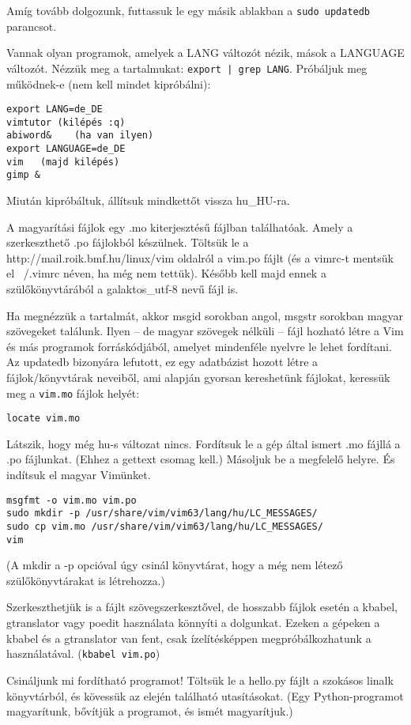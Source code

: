 \documentclass[a4paper]{article}
\newcommand{\alapcim}{http://mail.roik.bmf.hu/linux}
\newcommand{\code}{\texttt}
\begin{document}
Amíg tovább dolgozunk, futtassuk le egy másik ablakban a \code{sudo
updatedb} parancsot.

Vannak olyan programok, amelyek a LANG változót nézik, mások a LANGUAGE
változót. Nézzük meg a tartalmukat: \code{export | grep LANG}.
Próbáljuk meg működnek-e (nem kell mindet kipróbálni):
\begin{Verbatim}
export LANG=de_DE
vimtutor (kilépés :q)
abiword&	(ha van ilyen)
export LANGUAGE=de_DE
vim   (majd kilépés)
gimp &
\end{Verbatim}
Miután kipróbáltuk, állítsuk mindkettőt vissza hu\_HU-ra.

A magyarítási fájlok egy .mo kiterjesztésű fájlban találhatóak. Amely a
szerkeszthető .po fájlokból készülnek. Töltsük le a \alapcim/vim
oldalról a vim.po fájlt (és a vimrc-t mentsük el ~/.vimrc néven, ha még
nem tettük). Később kell majd ennek a szülőkönyvtárából a galaktos\_utf-8
nevű fájl is.

Ha megnézzük a tartalmát, akkor msgid sorokban angol, msgstr sorokban
magyar szövegeket találunk. Ilyen -- de magyar szövegek nélküli -- fájl
hozható létre a Vim  és más programok forráskódjából, amelyet mindenféle
nyelvre le lehet fordítani. Az updatedb bizonyára lefutott, ez egy
adatbázist hozott létre a fájlok/könyvtárak neveiből, ami alapján
gyorsan kereshetünk fájlokat, keressük meg a \code{vim.mo} fájlok
helyét:
\begin{Verbatim}
locate vim.mo
\end{Verbatim}

Látszik, hogy még hu-s változat nincs. Fordítsuk le a gép által ismert
.mo fájllá a .po fájlunkat. (Ehhez a gettext csomag kell.) Másoljuk be
a megfelelő helyre. És indítsuk el magyar Vimünket.
\begin{Verbatim}
msgfmt -o vim.mo vim.po
sudo mkdir -p /usr/share/vim/vim63/lang/hu/LC_MESSAGES/
sudo cp vim.mo /usr/share/vim/vim63/lang/hu/LC_MESSAGES/
vim
\end{Verbatim}
(A mkdir a -p opcióval úgy csinál könyvtárat, hogy a még nem létező
szülőkönyvtárakat is létrehozza.)

Szerkeszthetjük is a fájlt szövegszerkesztővel, de hosszabb fájlok
esetén a kbabel, gtranslator vagy poedit használata könnyíti a
dolgunkat. Ezeken a gépeken a kbabel és a gtranslator van fent, csak ízelítésképpen
megpróbálkozhatunk a használatával. (\code{kbabel vim.po})

Csináljunk mi fordítható programot! Töltsük le a hello.py
fájlt a szokásos linalk könyvtárból, és kövessük az elején található
utasításokat.  (Egy Python-programot  magyarítunk, bővítjük a programot,
és ismét magyarítjuk.)
\end{document}
